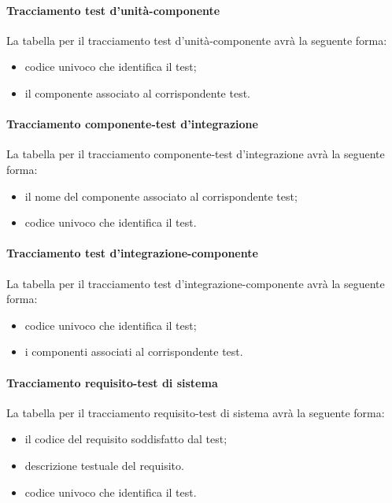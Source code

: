 \paragraph{Tracciamento test d'unità-componente}
La tabella per il tracciamento test d'unità-componente avrà la seguente forma:
\begin{itemize}
\item {}codice univoco che identifica il test;
\item {} il componente associato al corrispondente test.
\end{itemize}



\paragraph{Tracciamento componente-test d'integrazione}
La tabella per il tracciamento componente-test d'integrazione avrà la seguente forma:
\begin{itemize}
\item {} il nome del componente associato al corrispondente test;
\item {}codice univoco che identifica il test.
\end{itemize}

\paragraph{Tracciamento test d'integrazione-componente}
La tabella per il tracciamento test d'integrazione-componente avrà la seguente forma:
\begin{itemize}
\item {}codice univoco che identifica il test;
\item {} i componenti associati al corrispondente test.
\end{itemize}


\paragraph{Tracciamento requisito-test di sistema}
La tabella per il tracciamento requisito-test di sistema avrà la seguente forma:
\begin{itemize}
\item {} il codice del requisito soddisfatto dal test;
\item {} descrizione testuale del requisito.
\item {}codice univoco che identifica il test.
\end{itemize}

